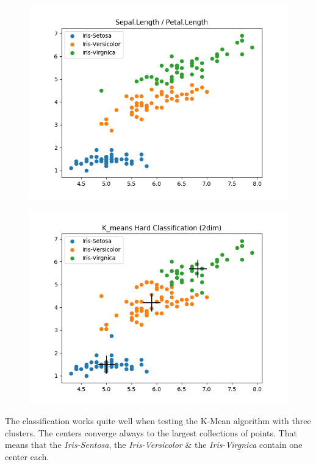 \documentclass[a4paper]{article}
\begin{document}
\begin{enumerate}
\begin{figure}[htp]
\centering
\begin{minipage}{0.4\textwidth}
  \includegraphics[scale=0.5]{plots/basic_scenario1_cmpnt3.png}
  \label{fig:16}
\end{minipage}
\hfill
\begin{minipage}{0.4\textwidth}
  \includegraphics[scale=0.5]{plots/hard_classification_scenario1_cmpnt3.png}
  \label{fig:17}
\end{minipage}
\end{figure} 
The classification works quite well when testing the K-Mean algorithm with three clusters. The centers converge always to the largest collections of points. That means that the \textit{Iris-Sentosa}, the \textit{Iris-Versicolor} \& the \textit{Iris-Virgnica} contain one center each. \\


\end{enumerate}
\end{document}
